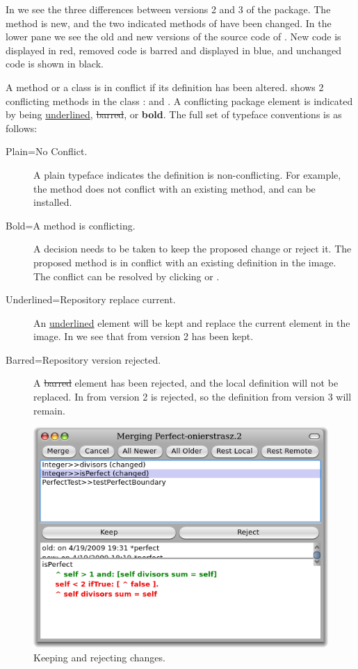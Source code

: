 \documentclass[a4paper,10pt,twoside]{book}
\begin{document}
In  we see the three differences between versions 2 and 3 of the  package. The method  is new, and the two indicated methods of  have been changed. In the lower pane we see the old and new versions of the source code of .
New code is displayed in red, removed code is barred and displayed in blue, and unchanged code is shown in black. 

A method or a class is in conflict if its definition has been altered.  shows 2 conflicting methods in the class :  and . A conflicting package element is indicated by being \underline{underlined}, \sout{barred}, or {\bf bold}. The full set of typeface conventions is as follows:

\begin{description}
\item[Plain=No Conflict.] A plain typeface indicates the definition is non-conflicting. For example, the method  does not conflict with an existing method, and can be installed.
\item[Bold=A method is conflicting.] A decision needs to be taken to keep the proposed change or reject it. The proposed method  is in conflict with an existing definition in the image. The conflict can be resolved by clicking  or .
\item[Underlined=Repository replace current.] An \underline{underlined} element will be kept and replace the current element in the image. In  we see that  from version 2 has been kept.
\item[Barred=Repository version rejected.] A \sout{barred} element has been rejected, and the local definition will not be replaced. In   from version 2 is rejected, so the definition from version 3 will remain.
\end{description}

\begin{figure}[ht]\centering
	\includegraphics[width=.8\textwidth]{keepReject}
	\caption{Keeping and rejecting changes.
	}
\end{figure}
\end{document}
